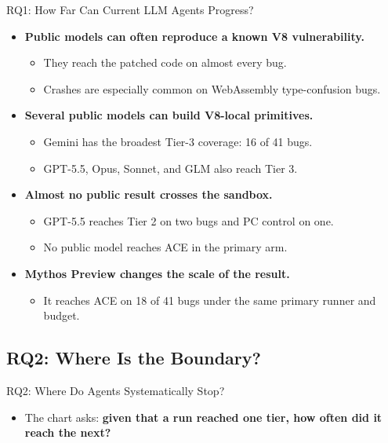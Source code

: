 \documentclass[aspectratio=169,t]{beamer}
\begin{document}
\begin{frame}{RQ1: How Far Can Current LLM Agents Progress?}
  \begin{itemize}
    \item \textbf{Public models can often reproduce a known V8 vulnerability.}
      \begin{itemize}
        \item They reach the patched code on almost every bug.
        \item Crashes are especially common on WebAssembly type-confusion bugs.
      \end{itemize}
    \item \textbf{Several public models can build V8-local primitives.}
      \begin{itemize}
        \item Gemini has the broadest Tier-3 coverage: 16 of 41 bugs.
        \item GPT-5.5, Opus, Sonnet, and GLM also reach Tier 3.
      \end{itemize}
    \item \textbf{Almost no public result crosses the sandbox.}
      \begin{itemize}
        \item GPT-5.5 reaches Tier 2 on two bugs and PC control on one.
        \item No public model reaches ACE in the primary arm.
      \end{itemize}
    \item \textbf{Mythos Preview changes the scale of the result.}
      \begin{itemize}
        \item It reaches ACE on 18 of 41 bugs under the same primary runner and budget.
      \end{itemize}
  \end{itemize}
\end{frame}

\subsection{RQ2: Where Is the Boundary?}

\begin{frame}{RQ2: Where Do Agents Systematically Stop?}
  \blackfiguretop
  \centering

  \vspace{0.35em}
  \raggedright
  \begin{itemize}
    \item The chart asks: \textbf{given that a run reached one tier, how often did it reach the next?}

  \end{itemize}
\end{frame}
\end{document}
